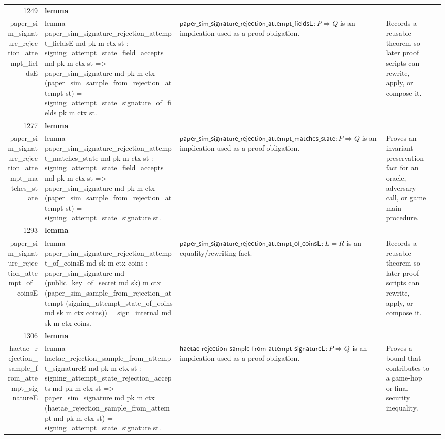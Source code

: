 \documentclass[10pt]{article}
\newcommand{\ec}[1]{\begingroup\ttfamily\scriptsize #1\endgroup}
\begin{document}
\begin{longtable}{r L{0.17\textwidth} L{0.26\textwidth} L{0.27\textwidth} L{0.20\textwidth}}
1249 & \textbf{lemma}\\\ec{paper\_sim\_signature\_rejection\_attempt\_fieldsE} & \ec{lemma paper\_sim\_signature\_rejection\_attempt\_fieldsE md pk m ctx st : signing\_attempt\_state\_field\_accepts md pk m ctx st => paper\_sim\_signature md pk m ctx (paper\_sim\_sample\_from\_rejection\_attempt st) = signing\_attempt\_state\_signature\_of\_fields pk m ctx st.} & \(\mathsf{paper\_sim\_signature\_rejection\_attempt\_fieldsE} : P \Rightarrow Q\) is an implication used as a proof obligation. & Records a reusable theorem so later proof scripts can rewrite, apply, or compose it. \\
1277 & \textbf{lemma}\\\ec{paper\_sim\_signature\_rejection\_attempt\_matches\_state} & \ec{lemma paper\_sim\_signature\_rejection\_attempt\_matches\_state md pk m ctx st : signing\_attempt\_state\_field\_accepts md pk m ctx st => paper\_sim\_signature md pk m ctx (paper\_sim\_sample\_from\_rejection\_attempt st) = signing\_attempt\_state\_signature st.} & \(\mathsf{paper\_sim\_signature\_rejection\_attempt\_matches\_state} : P \Rightarrow Q\) is an implication used as a proof obligation. & Proves an invariant preservation fact for an oracle, adversary call, or game main procedure. \\
1293 & \textbf{lemma}\\\ec{paper\_sim\_signature\_rejection\_attempt\_of\_coinsE} & \ec{lemma paper\_sim\_signature\_rejection\_attempt\_of\_coinsE md sk m ctx coins : paper\_sim\_signature md (public\_key\_of\_secret md sk) m ctx (paper\_sim\_sample\_from\_rejection\_attempt (signing\_attempt\_state\_of\_coins md sk m ctx coins)) = sign\_internal md sk m ctx coins.} & \(\mathsf{paper\_sim\_signature\_rejection\_attempt\_of\_coinsE} : L = R\) is an equality/rewriting fact. & Records a reusable theorem so later proof scripts can rewrite, apply, or compose it. \\
1306 & \textbf{lemma}\\\ec{haetae\_rejection\_sample\_from\_attempt\_signatureE} & \ec{lemma haetae\_rejection\_sample\_from\_attempt\_signatureE md pk m ctx st : signing\_attempt\_state\_rejection\_accepts md pk m ctx st => paper\_sim\_signature md pk m ctx (haetae\_rejection\_sample\_from\_attempt md pk m ctx st) = signing\_attempt\_state\_signature st.} & \(\mathsf{haetae\_rejection\_sample\_from\_attempt\_signatureE} : P \Rightarrow Q\) is an implication used as a proof obligation. & Proves a bound that contributes to a game-hop or final security inequality. \\

\end{longtable}
\end{document}
